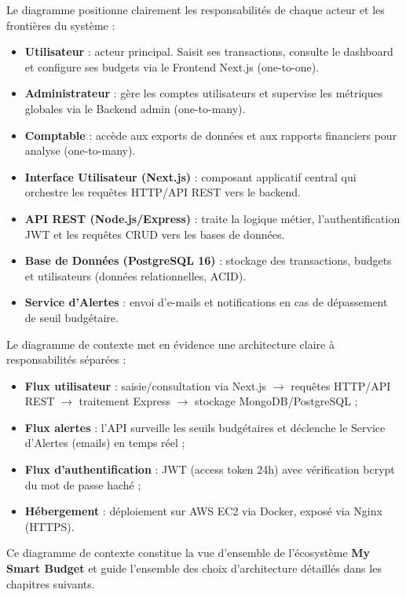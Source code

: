 \begin{tcolorbox}[colback=gray!10!white,colframe=gray!70!black,title=\textbf{Analyse du diagramme de contexte}]
Le diagramme positionne clairement les responsabilités de chaque acteur et les frontières du système :
\begin{itemize}
    \item \textbf{Utilisateur} : acteur principal. Saisit ses transactions, consulte le dashboard et configure ses budgets via le Frontend Next.js (one-to-one).
    \item \textbf{Administrateur} : gère les comptes utilisateurs et supervise les métriques globales via le Backend admin (one-to-many).
    \item \textbf{Comptable} : accède aux exports de données et aux rapports financiers pour analyse (one-to-many).
    \item \textbf{Interface Utilisateur (Next.js)} : composant applicatif central qui orchestre les requêtes HTTP/API REST vers le backend.
    \item \textbf{API REST (Node.js/Express)} : traite la logique métier, l'authentification JWT et les requêtes CRUD vers les bases de données.
    \item \textbf{Base de Données (PostgreSQL 16)} : stockage des transactions, budgets et utilisateurs (données relationnelles, ACID).
    \item \textbf{Service d'Alertes} : envoi d'e-mails et notifications en cas de dépassement de seuil budgétaire.
\end{itemize}
\end{tcolorbox}

\begin{tcolorbox}[colback=green!5!white,colframe=green!60!black,title=\textbf{Synthèse des flux applicatifs}]
Le diagramme de contexte met en évidence une architecture claire à responsabilités séparées :
\begin{itemize}
    \item \textbf{Flux utilisateur} : saisie/consultation via Next.js $\rightarrow$ requêtes HTTP/API REST $\rightarrow$ traitement Express $\rightarrow$ stockage MongoDB/PostgreSQL ;
    \item \textbf{Flux alertes} : l'API surveille les seuils budgétaires et déclenche le Service d'Alertes (emails) en temps réel ;
    \item \textbf{Flux d'authentification} : JWT (access token 24h) avec vérification bcrypt du mot de passe haché ;
    \item \textbf{Hébergement} : déploiement sur AWS EC2 via Docker, exposé via Nginx (HTTPS).
\end{itemize}

Ce diagramme de contexte constitue la vue d'ensemble de l'écosystème \textbf{My Smart Budget} et guide l'ensemble des choix d'architecture détaillés dans les chapitres suivants.
\end{tcolorbox}

